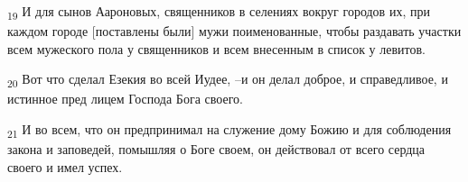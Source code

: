 \begin{tcolorbox}
\textsubscript{19} И для сынов Аароновых, священников в селениях вокруг городов их, при каждом городе [поставлены были] мужи поименованные, чтобы раздавать участки всем мужеского пола у священников и всем внесенным в список у левитов.
\end{tcolorbox}
\begin{tcolorbox}
\textsubscript{20} Вот что сделал Езекия во всей Иудее, --и он делал доброе, и справедливое, и истинное пред лицем Господа Бога своего.
\end{tcolorbox}
\begin{tcolorbox}
\textsubscript{21} И во всем, что он предпринимал на служение дому Божию и для соблюдения закона и заповедей, помышляя о Боге своем, он действовал от всего сердца своего и имел успех.
\end{tcolorbox}
